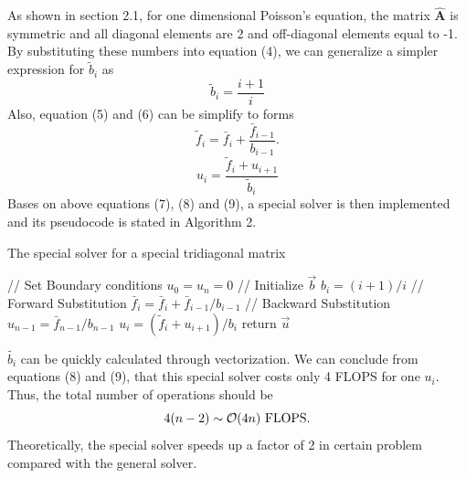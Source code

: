 \documentclass[12pt]{article}
\begin{document}
As shown in section 2.1, for one dimensional Poisson's equation, the matrix $\mathbf{\hat{A}}$ is symmetric and all diagonal elements are 2 and off-diagonal elements equal to -1. By substituting these numbers into equation (4), we can generalize a simpler expression for $\tilde{b}_i$ as
\begin{equation}
\tilde{b}_i = \frac{i+1}{i} 
\end{equation}
Also, equation (5) and (6) can be simplify to forms
\begin{equation}
\tilde{f}_i = \bar{f}_i + \frac{\bar{f}_{i-1}}{b_{i-1}}.
\end{equation}
\begin{equation}
u_i = \frac{\tilde{f}_i + u_{i+1}}{\tilde{b}_i}
\end{equation}
Bases on above equations (7), (8) and (9), a special solver is then implemented and its pseudocode is stated in Algorithm 2.
\begin{algorithm}
\caption{The special solver for a special tridiagonal matrix}
// Set Boundary conditions\;
$u_0 = u_{n} = 0$\;
// Initialize $\vec{b}$\;
$b_i = (i + 1)/i$\;
// Forward Substitution\;
{
  $\bar{f}_i = \bar{f}_i + \bar{f}_{i-1}/b_{i-1}$\;
}
// Backward Substitution\;
$u_{n-1}=\bar{f}_{n-1}/b_{n-1}$\; 
{
  $u_i = (\tilde{f}_i +u_{i+1})/b_i$\;
}
return $\vec{u}$\;
\end{algorithm}
$\tilde{b_i}$ can be quickly calculated through vectorization. We can conclude from equations (8) and (9), that this special solver costs only 4 FLOPS for one $u_i$. Thus, the total number of operations should be
\[
4(n-2) \sim \mathcal{O}(4n)\ \rm{FLOPS}.
\]
Theoretically, the special solver speeds up a factor of 2 in certain problem compared with the general solver.
\end{document}
